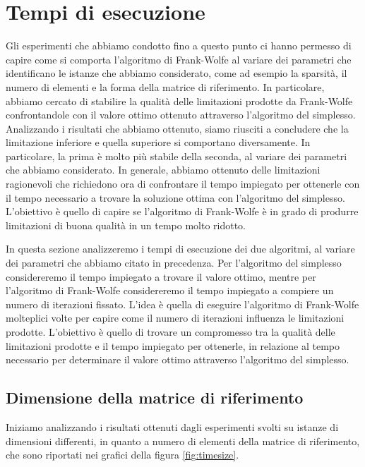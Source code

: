 \section{Tempi di esecuzione}
Gli esperimenti che abbiamo condotto fino a questo punto ci hanno permesso di capire come si comporta l'algoritmo di
Frank-Wolfe al variare dei parametri che identificano le istanze che abbiamo considerato, come ad esempio la sparsità,
il numero di elementi e la forma della matrice di riferimento. In particolare, abbiamo cercato di stabilire la qualità
delle limitazioni prodotte da Frank-Wolfe confrontandole con il valore ottimo ottenuto attraverso l'algoritmo del
simplesso. Analizzando i risultati che abbiamo ottenuto, siamo riusciti a concludere che la limitazione inferiore e
quella superiore si comportano diversamente. In particolare, la prima è molto più stabile della seconda, al variare dei
parametri che abbiamo considerato. In generale, abbiamo ottenuto delle limitazioni ragionevoli che richiedono ora di
confrontare il tempo impiegato per ottenerle con il tempo necessario a trovare la soluzione ottima con l'algoritmo del
simplesso. L'obiettivo è quello di capire se l'algoritmo di Frank-Wolfe è in grado di produrre limitazioni di buona
qualità in un tempo molto ridotto.

In questa sezione analizzeremo i tempi di esecuzione dei due algoritmi, al variare dei parametri che abbiamo
citato in precedenza. Per l'algoritmo del simplesso considereremo il tempo impiegato a trovare il valore ottimo, mentre
per l'algoritmo di Frank-Wolfe considereremo il tempo impiegato a compiere un numero di iterazioni fissato. L'idea è
quella di eseguire l'algoritmo di Frank-Wolfe molteplici volte per capire come il numero di iterazioni influenza le
limitazioni prodotte. L'obiettivo è quello di trovare un compromesso tra la qualità delle limitazioni prodotte e il
tempo impiegato per ottenerle, in relazione al tempo necessario per determinare il valore ottimo attraverso l'algoritmo
del simplesso.

\subsection{Dimensione della matrice di riferimento}
Iniziamo analizzando i risultati ottenuti dagli esperimenti svolti su istanze di dimensioni
differenti, in quanto a numero di elementi della matrice di riferimento, che sono riportati nei grafici della figura
\ref{fig:timesize}.


